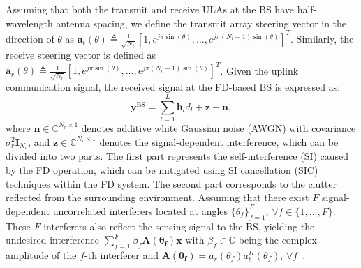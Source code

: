 \documentclass[comsoc,journal]{IEEEtran}
\begin{document}
Assuming that both the transmit and receive ULAs at the BS have half-wavelength antenna spacing, we define the transmit array steering vector in the direction of $\theta$ as $\mathbf{a}_t(\theta) \triangleq \frac{1}{\sqrt{N_t}} \left[ 1, e^{j\pi \sin(\theta)}, \dots, e^{j\pi (N_t-1) \sin(\theta)} \right]^T$. Similarly, the receive steering vector is defined as $\mathbf{a}_r(\theta) \triangleq \frac{1}{\sqrt{N_r}} \left[ 1, e^{j\pi \sin(\theta)}, \dots, e^{j\pi (N_r-1) \sin(\theta)} \right]^T$. 
Given the uplink communication signal, the received signal at the FD-based BS is expressed as:
\begin{equation}
    \mathbf{y}^{\text{BS}} = \sum_{l=1}^{L} \mathbf{h}_l d_l + \mathbf{z} + \mathbf{n},
\end{equation}
where 
$\mathbf{n} \in \mathbb{C}^{N_r \times 1}$
denotes additive white Gaussian noise (AWGN) with covariance $\sigma_r^2 \mathbf{I}_{N_r}$, and $\mathbf{z} \in \mathbb{C}^{N_r \times 1}$ denotes the signal-dependent interference, which can be divided into two parts. The first part represents the self-interference (SI) caused by the FD operation, which can be mitigated using SI cancellation (SIC) techniques within the FD system\cite{chauhan2024full}. The second part corresponds to the clutter reflected
from the surrounding environment. Assuming that there exist $F$ signal-dependent uncorrelated interferers located at angles $\{\theta_f\}_{f=1}^F$, $\forall f \in \{1, \dots, F\}$. These $F$ interferers also reflect the sensing signal to the BS, yielding the undesired interference $\sum_{f=1}^F \beta_f \mathbf{A(\theta_f)} \mathbf{x}$ with $\beta_f \in \mathbb{C}$ being the complex amplitude of the $f$-th interferer and $\mathbf{A(\theta_f)} = a_r(\theta_f) a_t^H(\theta_f)$, $\forall f$~\cite{he2023full}.
\end{document}
